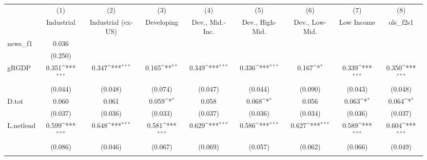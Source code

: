 {
\def\sym#1{\ifmmode^{#1}\else\(^{#1}\)\fi}
\begin{tabular}{l*{8}{c}}
\toprule
            &\multicolumn{1}{c}{(1)}&\multicolumn{1}{c}{(2)}&\multicolumn{1}{c}{(3)}&\multicolumn{1}{c}{(4)}&\multicolumn{1}{c}{(5)}&\multicolumn{1}{c}{(6)}&\multicolumn{1}{c}{(7)}&\multicolumn{1}{c}{(8)}\\
            &\multicolumn{1}{c}{Industrial}&\multicolumn{1}{c}{Industrial (ex-US)}&\multicolumn{1}{c}{Developing}&\multicolumn{1}{c}{Dev., Mid.-Inc.}&\multicolumn{1}{c}{Dev., High-Mid.}&\multicolumn{1}{c}{Dev., Low-Mid.}&\multicolumn{1}{c}{Low Income}&\multicolumn{1}{c}{ols\_f2s1}\\
\midrule
news\_f1     &       0.036         &                     &                     &                     &                     &                     &                     &                     \\
            &     (0.250)         &                     &                     &                     &                     &                     &                     &                     \\
\addlinespace
gRGDP       &       0.351\sym{***}&       0.347\sym{***}&       0.165\sym{**} &       0.349\sym{***}&       0.336\sym{***}&       0.167\sym{*}  &       0.339\sym{***}&       0.350\sym{***}\\
            &     (0.044)         &     (0.048)         &     (0.074)         &     (0.047)         &     (0.044)         &     (0.090)         &     (0.043)         &     (0.048)         \\
\addlinespace
D.tot       &       0.060         &       0.061         &       0.059\sym{*}  &       0.058         &       0.068\sym{*}  &       0.056         &       0.063\sym{*}  &       0.064\sym{*}  \\
            &     (0.037)         &     (0.036)         &     (0.033)         &     (0.037)         &     (0.036)         &     (0.034)         &     (0.036)         &     (0.037)         \\
\addlinespace
L.netlend   &       0.599\sym{***}&       0.648\sym{***}&       0.581\sym{***}&       0.629\sym{***}&       0.586\sym{***}&       0.627\sym{***}&       0.589\sym{***}&       0.604\sym{***}\\
            &     (0.086)         &     (0.046)         &     (0.067)         &     (0.069)         &     (0.057)         &     (0.062)         &     (0.066)         &     (0.049)         \\
\addlinespace

\end{tabular}}
